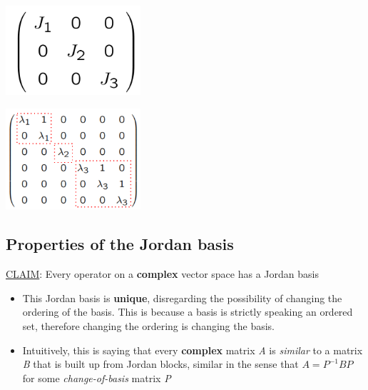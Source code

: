\documentclass{article}
\begin{document}
\begin{minipage}{0.45\linewidth}
    \centering
    \includegraphics[width=5cm]{S1/jordanBasis1.PNG}
    \captionsetup{justification=centering}
\end{minipage}%
\hfill
\begin{minipage}{0.55\linewidth}
    \centering
    \includegraphics[width=5cm]{S1/jordanBasis2.PNG}
    \captionsetup{justification=centering}
\end{minipage}%

\newpage
\subsection{Properties of the Jordan basis}
\begin{large}
    \underline{CLAIM}: Every operator on a \textbf{complex} vector space has a Jordan basis
\end{large}

\begin{itemize}
    \item This Jordan basis is \textbf{unique}, disregarding the possibility of changing the ordering of the basis.
            This is because a basis is strictly speaking an ordered set, therefore changing the ordering is changing the basis.
    \item Intuitively, this is saying that every \textbf{complex} matrix \textit{A} 
            is \textit{similar} to a matrix \textit{B} that is built up from Jordan blocks, 
            similar in the sense that $A = P^{-1}BP$ for some \textit{change-of-basis} matrix \textit{P}
\end{itemize}
\end{document}
